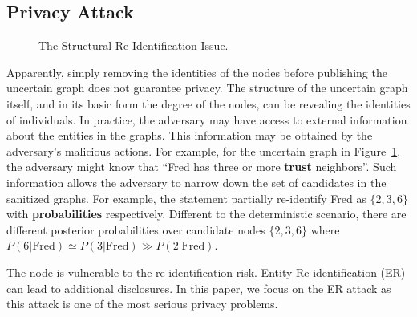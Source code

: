 \subsection{Privacy Attack}
\label{sec:AMPC}
\vspace{-5pt}
\begin{figure}[!htb]
  \vspace{-10pt}
    \vspace{-7pt}
    \caption{The Structural Re-Identification Issue.}
    \label{fig:privacyAttack}
    \vspace{-7pt}
\end{figure} 
Apparently, simply removing the identities of the nodes before publishing the uncertain graph does not guarantee privacy.  The structure of the uncertain graph itself, and in its basic form the degree of the nodes, can be revealing the identities of individuals. 
In practice, the adversary may have access to external information about the entities in the graphs. This information may be obtained by the adversary's malicious actions. 
For example, for the uncertain graph in Figure~\ref{fig:privacyAttack}, the adversary might know that ``Fred has three or more \textbf{trust} neighbors''. Such information allows the adversary to narrow down the set of candidates in the sanitized graphs. For example, the statement partially re-identify Fred as $\lbrace 2,3,6 \rbrace$ with \textbf{probabilities} respectively. 
Different to the deterministic scenario,  there are different posterior probabilities over candidate nodes $\lbrace 2,3,6 \rbrace$ where $P(6|\text{Fred}) \simeq P(3|\text{Fred}) \gg P(2|\text{Fred})$.

The node is vulnerable to the re-identification risk. Entity Re-identification (ER) can lead to additional disclosures. In this paper, we focus on the ER attack as this attack is one of the most serious privacy problems. 

\vspace{-12pt}
